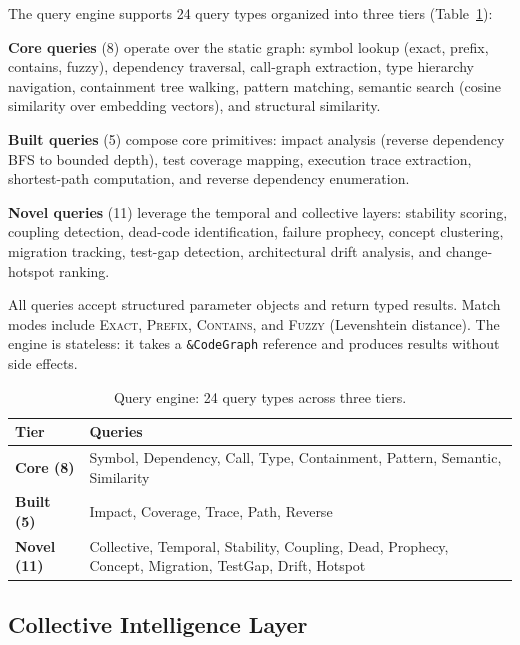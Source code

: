 \documentclass[10pt, twocolumn]{article}
\begin{document}
The query engine supports 24 query types organized into three tiers (Table~\ref{tab:queries}):

\textbf{Core queries} (8) operate over the static graph: symbol lookup (exact, prefix, contains, fuzzy), dependency traversal, call-graph extraction, type hierarchy navigation, containment tree walking, pattern matching, semantic search (cosine similarity over embedding vectors), and structural similarity.

\textbf{Built queries} (5) compose core primitives: impact analysis (reverse dependency BFS to bounded depth), test coverage mapping, execution trace extraction, shortest-path computation, and reverse dependency enumeration.

\textbf{Novel queries} (11) leverage the temporal and collective layers: stability scoring, coupling detection, dead-code identification, failure prophecy, concept clustering, migration tracking, test-gap detection, architectural drift analysis, and change-hotspot ranking.

All queries accept structured parameter objects and return typed results. Match modes include \textsc{Exact}, \textsc{Prefix}, \textsc{Contains}, and \textsc{Fuzzy} (Levenshtein distance). The engine is stateless: it takes a \texttt{\&CodeGraph} reference and produces results without side effects.

\begin{table}[t]
\caption{Query engine: 24 query types across three tiers.}
\label{tab:queries}
\centering
\scriptsize
\begin{tabular}{@{}lp{4.8cm}@{}}
\toprule
\textbf{Tier} & \textbf{Queries} \\
\midrule
\textbf{Core (8)} & Symbol, Dependency, Call, Type, Containment, Pattern, Semantic, Similarity \\
\addlinespace
\textbf{Built (5)} & Impact, Coverage, Trace, Path, Reverse \\
\addlinespace
\textbf{Novel (11)} & Collective, Temporal, Stability, Coupling, Dead, Prophecy, Concept, Migration, TestGap, Drift, Hotspot \\
\bottomrule
\end{tabular}
\end{table}


\subsection{Collective Intelligence Layer}
\label{sec:collective}
\end{document}
